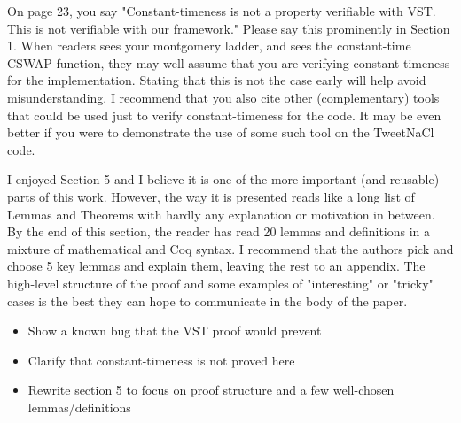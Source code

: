 On page 23, you say "Constant-timeness is not a property verifiable with VST. This is not verifiable with our framework." Please say this prominently in Section 1. When readers sees your montgomery ladder, and sees the constant-time CSWAP function, they may well assume that you are verifying constant-timeness for the implementation. Stating that this is not the case early will help avoid misunderstanding. I recommend that you also cite other (complementary) tools that could be used just to verify constant-timeness for the code. It may be even better if you were to demonstrate the use of some such tool on the TweetNaCl code.

I enjoyed Section 5 and I believe it is one of the more important (and reusable) parts of this work. However, the way it is presented reads like a long list of Lemmas and Theorems with hardly any explanation or motivation in between. By the end of this section, the reader has read 20 lemmas and definitions in a mixture of mathematical and Coq syntax. I recommend that the authors pick and choose 5 key lemmas and explain them, leaving the rest to an appendix. The high-level structure of the proof and some examples of "interesting" or "tricky" cases is the best they can hope to communicate in the body of the paper.

\begin{center}
\end{center}

\begin{itemize}
    \item Show a known bug that the VST proof would prevent
    \item Clarify that constant-timeness is not proved here
    \item Rewrite section 5 to focus on proof structure and a few well-chosen lemmas/definitions
\end{itemize}
